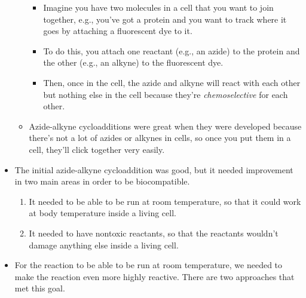 \documentclass[../notes.tex]{subfiles}
\begin{document}
\begin{itemize}
\begin{itemize}
\begin{itemize}
            \item Imagine you have two molecules in a cell that you want to join together, e.g., you've got a protein and you want to track where it goes by attaching a fluorescent dye to it.
            \item To do this, you attach one reactant (e.g., an azide) to the protein and the other (e.g., an alkyne) to the fluorescent dye.
            \item Then, once in the cell, the azide and alkyne will react with each other but nothing else in the cell because they're \emph{chemoselective} for each other.
        \end{itemize}
        \item Azide-alkyne cycloadditions were great when they were developed because there's not a lot of azides or alkynes in cells, so once you put them in a cell, they'll click together very easily.
    \end{itemize}
    \item The initial azide-alkyne cycloaddition was good, but it needed improvement in two main areas in order to be biocompatible.
    \begin{enumerate}
        \item It needed to be able to be run at room temperature, so that it could work at body temperature inside a living cell.
        \item It needed to have nontoxic reactants, so that the reactants wouldn't damage anything else inside a living cell.
    \end{enumerate}
    \item For the reaction to be able to be run at room temperature, we needed to make the reaction even more highly reactive. There are two approaches that met this goal.
    \begin{figure}[H]
        \centering
        \begin{subfigure}[b]{0.49\linewidth}
            \centering
\end{subfigure}
\end{figure}
\end{itemize}
\end{document}
